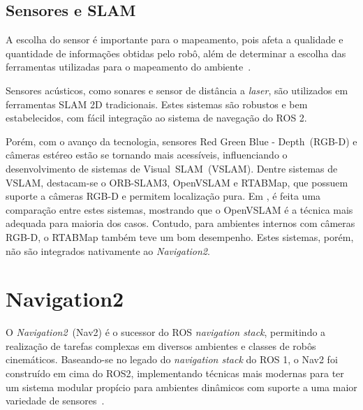 \documentclass[repeatfields,xlists,xpacks,oneside,yearsonly]{ufrgscca}
\begin{document}
\subsection{Sensores e SLAM}

A escolha do sensor é importante para o mapeamento,
pois afeta a qualidade e quantidade de informações obtidas pelo robô, além
de determinar a escolha das ferramentas utilizadas para o mapeamento do
ambiente~\cite{SensorAndSLAM}.

Sensores acústicos, como sonares e sensor de distância a \textit{laser}, são utilizados
em ferramentas SLAM 2D tradicionais. Estes sistemas são robustos e bem estabelecidos,
com fácil integração ao sistema de navegação do ROS 2.

Porém, com o avanço da tecnologia, sensores Red Green Blue - Depth~(RGB-D)
e câmeras estéreo estão se tornando mais acessíveis, influenciando o
desenvolvimento de sistemas de Visual~SLAM~(VSLAM).
Dentre sistemas de VSLAM, destacam-se o ORB-SLAM3, OpenVSLAM e RTABMap, que possuem suporte
a câmeras RGB-D e permitem localização pura.
Em \textcite{VSLAM}, é feita uma comparação entre estes sistemas, mostrando que o
OpenVSLAM é a técnica mais adequada para maioria dos casos.
Contudo, para ambientes internos com câmeras RGB-D, o RTABMap também teve um bom desempenho.
Estes sistemas, porém, não são integrados nativamente ao \textit{Navigation2}.


\section{Navigation2}

O \textit{Navigation2}~(Nav2) é o sucessor do ROS \textit{navigation stack}, permitindo
a realização de tarefas complexas em diversos ambientes e classes de robôs cinemáticos.
Baseando-se no legado do \textit{navigation stack} do ROS 1, o Nav2 foi construído em cima
do ROS2, implementando técnicas mais modernas para ter um sistema modular propício para
ambientes dinâmicos com suporte a uma maior variedade de sensores~\cite{Nav2}.
\end{document}
